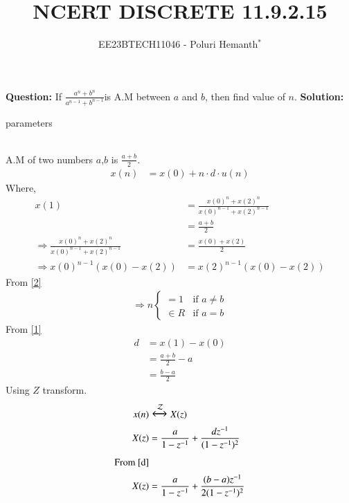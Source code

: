 \documentclass[journal,12pt,twocolumn]{IEEEtran}
\theoremstyle{remark}
\begin{document}

\vspace{3cm}


\title{NCERT DISCRETE 11.9.2.15}
\author{EE23BTECH11046 - Poluri Hemanth$^{*}$}
\maketitle
\textbf{Question:}
If \( \frac{a^n +b^n}{a^{n-1} + b^{n-1}}\)is A.M between $a$ and $b$, then find value of $n$.
\break
\textbf{Solution:}
\begin{table}[h!]
        
        \caption{parameters}
\end{table}
\\A.M of two numbers $a$,$b$ is $\frac{a+b}{2}$.
\begin{align}
	x(n)&=x(0)+n\cdot d\cdot u(n)\label{1}
\end{align}
Where,
\begin{align}
	x(1)&=\frac{x(0)^n +x(2)^n}{x(0)^{n-1} + x(2)^{n-1}}\label{r}\\ 
	&=\frac{a+b}{2}\\
	\Rightarrow\frac{x(0)^n +x(2)^n}{x(0)^{n-1} + x(2)^{n-1}}&= \frac{x(0)+x(2)}{2}  \\
    \Rightarrow x(0)^{n-1}(x(0)-x(2))&=x(2)^{n-1}(x(0)-x(2))\label{2}
\end{align}
From \eqref{2}
\begin{align}
        \Rightarrow n
        \begin{cases}
                =1  &\text{if } a\neq b\\
                \in R &\text{if } a=b
        \end{cases}
\end{align}
From \eqref{1}\\
\begin{align}
	d&=x(1)-x(0)\\
	&=\frac{a+b}{2}-a\\
	&=\frac{b-a}{2}\label{d}
\end{align}
Using $Z$ transform.
\begin{align}
	x(n)&\Large\xleftrightarrow{\mathcal{Z}}X(z)\\
	X(z)&=\frac{a}{1-z^{-1}}+\frac{dz^{-1}}{(1-z^{-1})^2}\label{8}\\
	\notag\text{From \eqref{d}}\\
	X(z)&=\frac{a}{1-z^{-1}}+\frac{(b-a)z^{-1}}{2(1-z^{-1})^2}
\end{align}

 
\end{document}
